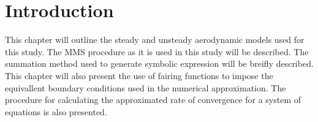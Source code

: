 
\section{Introduction}
This chapter will outline the steady and unsteady aerodynamic
models used for this study. The MMS procedure as it is used in this study will 
be described. The summation method used to generate symbolic expression will 
be breifly described. This chapter will also present the use of fairing functions 
to impose the equivallent boundary conditions used in the numerical approximation.
The procedure for calculating the approximated rate of convergence for a system
of equations is also presented.


